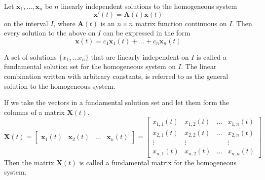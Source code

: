 \documentclass[../diffeq.tex]{subfiles}
\begin{document}
\begin{theorem}
    Let $\textbf{x}_1,\dots,\textbf{x}_n$ be $n$ linearly independent solutions to the homogeneous system 
    \[\textbf{x}'(t)=\textbf{A}(t)\textbf{x}(t)\]
    on the interval $I$, where $\textbf{A}(t)$ is an $n\times n$ matrix function continuous on $I$. Then every solution to the above on $I$ can be expressed in the form 
    \[ \textbf{x}(t)=c_1\textbf{x}_1(t)+\dots +c_n\textbf{x}_n(t)\]
\end{theorem}
A set of solutions $\{x_1,\dots x_n\}$ that are linearly independent on $I$ is called a fundamental solution set for the homogeneous system on $I$. The linear combination written with arbitrary constants, is referred to as the general solution to the homogeneous system.

If we take the vectors in a fundamental solution set and let them form the columns of a matrix $\textbf{X}(t)$.
\[ \textbf{X}(t)=\begin{bmatrix}
    \textbf{x}_1(t) & \textbf{x}_2(t) & \dots & \textbf{x}_n(t)
\end{bmatrix} = \begin{bmatrix}
    x_{1,1}(t) & x_{1,2}(t) & \dots & x_{1,n}(t) \\
    x_{2,1}(t) & x_{2,2}(t) & \dots & x_{2,n}(t) \\
    \vdots & \vdots & & \vdots \\
    x_{n,1}(t) & x_{n,2}(t) & \dots & x_{n,n}(t)
\end{bmatrix} \]
Then the matrix $\textbf{X}(t)$ is called a fundamental matrix for the homogeneous system.
\end{document}
